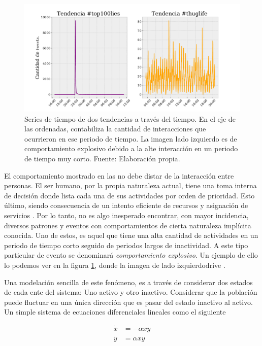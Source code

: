 \documentclass[../main.tex]{subfiles}
\begin{document}
\begin{figure}[h!]
    \centering
    \includegraphics[scale = 0.55]{images/introduction_timeserie.pdf}
    \caption{Series de tiempo de dos tendencias a través del tiempo. En el eje de las ordenadas, contabiliza la cantidad de interacciones que ocurrieron en ese periodo de tiempo. La imagen lado izquierdo es de comportamiento explosivo debido a la alte interacción en un periodo de tiempo muy corto. Fuente: Elaboración propia.}
    \label{fig:introducction_timeserie_example}
\end{figure}


El comportamiento mostrado en las \RMS no debe distar de la interacción entre personas. El ser humano, por la propia naturaleza actual, tiene una toma interna de decisión donde lista cada una de sus actividades por orden de prioridad. Esto último, siendo consecuencia de un intento eficiente de recursos y asignación de servicios \cite{Barabsi2005}. Por lo tanto, no es algo inesperado encontrar, con mayor incidencia, diversos patrones y eventos con comportamientos de cierta naturaleza implícita conocida. Uno de estos, es aquel que tiene una alta cantidad de actividades en un periodo de tiempo corto seguido de periodos largos de inactividad.  A este tipo particular de evento se denominará \textit{comportamiento explosivo}. Un ejemplo de ello lo podemos ver en la figura \ref{fig:introducction_timeserie_example}, donde la imagen de lado izquierdodrive
.

Una modelación sencilla de este fenómeno, es a través de considerar dos estados de cada ente del sistema: Uno activo y otro inactivo. Considerar que la población puede fluctuar en una única dirección que es pasar del estado inactivo al activo. Un simple sistema de ecuaciones diferenciales lineales como el siguiente

\begin{align*}
    \Dot{x} &= -\alpha xy \\
    \Dot{y} &= \alpha xy \\
\end{align*}
\end{document}
